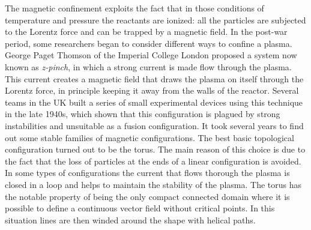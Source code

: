 %
The magnetic confinement exploits the fact that in those  conditions of temperature and pressure the reactants are  ionized: all the particles are subjected to the Lorentz force and can be trapped by a magnetic field.
%
In the post-war period, some researchers began to consider different ways to confine a plasma. George Paget Thomson of the Imperial College London proposed a system now known as \emph{z-pinch}, in which a strong current is made flow through the plasma. This current creates a magnetic field that draws the plasma on itself through the Lorentz force, in principle keeping it away from the walls of the reactor. Several teams in the UK built a series of small experimental devices using this technique in the late 1940s, which shown that this configuration is plagued by strong instabilities and unsuitable as a fusion configuration.
%
%
%
%
%
%
It took several years to find out some stable families of magnetic configurations. The best basic topological configuration turned out to be the torus. The main reason of this choice is due to the fact that the loss of particles at the ends of a linear configuration is avoided. In some types of configurations the current that flows thorough the plasma is closed in a loop and helps to maintain the stability of the plasma. The torus has the notable property of being the only compact connected domain where it is possible to define a continuous vector field without critical points. In this situation lines are then winded around the shape with helical paths. 
%
